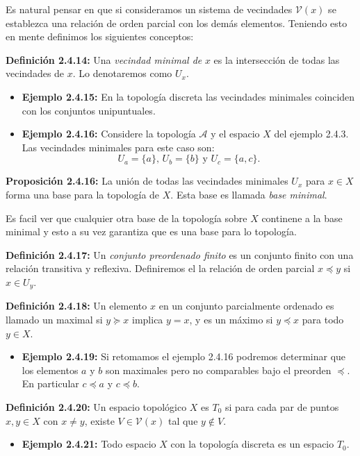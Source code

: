 Es natural pensar en que si consideramos un sistema de vecindades $\mathcal{V}(x)$ se establezca una relación de orden parcial con los demás elementos. Teniendo esto en mente definimos los siguientes conceptos:

\textbf{Definición 2.4.14:} Una \textit{vecindad minimal de} $x$ es la intersección de todas las vecindades de $x$. Lo denotaremos como $U_x$.

\begin{itemize}
    \item \textbf{Ejemplo 2.4.15:} En la topología discreta las vecindades minimales coinciden con los conjuntos unipuntuales.
    \item \textbf{Ejemplo 2.4.16:} Considere la topología $\mathcal{A}$ y el espacio $X$ del ejemplo 2.4.3. Las vecindades minimales para este caso son:
    $$U_a = \{a\}\text{, }U_b = \{b\}\text{ y }U_c=\{a,c\}.$$
\end{itemize}

\textbf{Proposición 2.4.16:} La unión de todas las vecindades minimales $U_x$ para $x\in X$ forma una base para la topología de $X$. Esta base es llamada \textit{base minimal}.

Es facil ver que cualquier otra base de la topología sobre $X$ continene a la base minimal y esto a su vez garantiza que es una base para lo topología.

\textbf{Definición 2.4.17:} Un \textit{conjunto preordenado finito} es un conjunto finito con una relación transitiva y reflexiva. Definiremos el la relación de orden parcial $x\preceq y$ si $x\in U_y$.

\textbf{Definición 2.4.18:} Un elemento $x$ en un conjunto parcialmente ordenado es llamado un maximal si $y\succeq x$ implica $y=x$, y es un máximo si $y\preceq x$ para todo $y\in X$.

\begin{itemize}
    \item \textbf{Ejemplo 2.4.19:} Si retomamos el ejemplo 2.4.16 podremos determinar que los elementos $a$ y $b$ son maximales pero no comparables bajo el preorden $\preceq$. En particular $c\preceq a$ y $c\preceq b$.
\end{itemize}

\textbf{Definición 2.4.20:} Un espacio topológico $X$ es $T_0$ si para cada par de puntos $x,y\in X$ con $x\neq y$, existe $V\in\mathcal{V}(x)$ tal que $y\notin V$.

\begin{itemize}
    \item \textbf{Ejemplo 2.4.21:} Todo espacio $X$ con la topología discreta es un espacio $T_0$.
\end{itemize}


